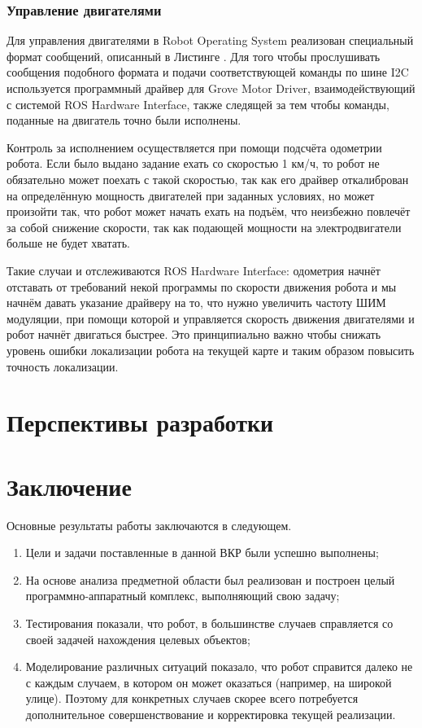 \documentclass[12pt,a4paper]{scrartcl}
\begin{document}
				\subsubsection{Управление двигателями}
					Для управления двигателями в Robot Operating System реализован специальный формат сообщений, описанный в Листинге . Для того чтобы прослушивать сообщения подобного формата и подачи соответствующей команды по шине I2C используется программный драйвер для Grove Motor Driver, взаимодействующий с системой ROS Hardware Interface, также следящей за тем чтобы команды, поданные на двигатель точно были исполнены.
					
					Контроль за исполнением осуществляется при помощи подсчёта одометрии робота. Если было выдано задание ехать со скоростью 1 км/ч, то робот не обязательно может поехать с такой скоростью, так как его драйвер откалиброван на определённую мощность двигателей при заданных условиях, но может произойти так, что робот может начать ехать на подъём, что неизбежно повлечёт за собой снижение скорости, так как подающей мощности на электродвигатели больше не будет хватать. 
					
					Такие случаи и отслеживаются ROS Hardware Interface: одометрия начнёт отставать от требований некой программы по скорости движения робота и мы начнём давать указание драйверу на то, что нужно увеличить частоту ШИМ модуляции, при помощи которой и управляется скорость движения двигателями и робот начнёт двигаться быстрее. Это принципиально важно чтобы снижать уровень ошибки локализации робота на текущей карте и таким образом повысить точность локализации.
			
		\section{Перспективы разработки} \label{sec:perspective}
			
			
		\section*{Заключение}
			Основные результаты работы заключаются в следующем.
			\begin{enumerate}
				\item Цели и задачи поставленные в данной ВКР были успешно выполнены;
				\item На основе анализа предметной области был реализован и построен целый программно-аппаратный комплекс, выполняющий свою задачу;
				\item Тестирования показали, что робот, в большинстве случаев справляется со своей задачей нахождения целевых объектов;
				\item Моделирование различных ситуаций показало, что робот справится далеко не с каждым случаем, в котором он может оказаться (например, на широкой улице). Поэтому для конкретных случаев скорее всего потребуется дополнительное совершенствование и корректировка текущей реализации.
			\end{enumerate}
			
\end{document}
